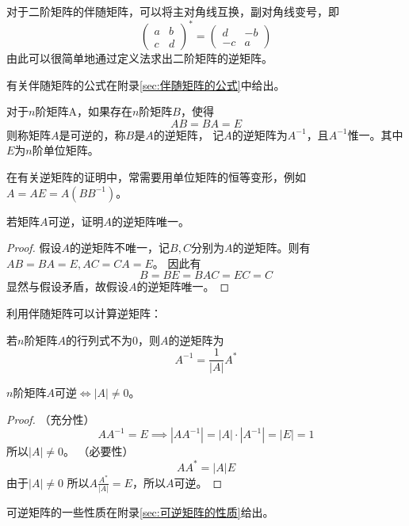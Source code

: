 对于二阶矩阵的伴随矩阵，可以将主对角线互换，副对角线变号，即
\begin{equation}
    \begin{pmatrix}
        a & b \\
        c & d
    \end{pmatrix}^*
    =
    \begin{pmatrix}
        d  & -b \\
        -c & a
    \end{pmatrix}
\end{equation}
由此可以很简单地通过定义法求出二阶矩阵的逆矩阵。

有关伴随矩阵的公式在附录\ref{sec:伴随矩阵的公式}中给出。

\begin{definition}
    对于$n$阶矩阵A，如果存在$n$阶矩阵$B$，使得
    \[ AB = BA = E \]
    则称矩阵$A$是可逆的，称$B$是$A$的逆矩阵，
    记$A$的逆矩阵为$A^{-1}$，且$A^{-1}$惟一。其中$E$为$n$阶单位矩阵。
\end{definition}
在有关逆矩阵的证明中，常需要用单位矩阵的恒等变形，例如$A=AE=A(BB^{-1})$。
\begin{example}
    若矩阵$A$可逆，证明$A$的逆矩阵唯一。
\end{example}
\begin{proof}
    假设$A$的逆矩阵不唯一，记$B,C$分别为$A$的逆矩阵。则有$AB=BA=E, AC=CA=E$。
    因此有
    \[ B = BE = BAC = EC = C \]
    显然与假设矛盾，故假设$A$的逆矩阵唯一。
\end{proof}

利用伴随矩阵可以计算逆矩阵：
\begin{theorem}
    若$n$阶矩阵$A$的行列式不为$0$，则$A$的逆矩阵为
    \[
        A^{-1} = \frac{1}{|A|}A^*
    \]
\end{theorem}

\begin{theorem}
    $n$阶矩阵$A$可逆$\iff |A|\neq 0$。
\end{theorem}
\begin{proof}
    （充分性）
    \[ AA^{-1} = E \implies |AA^{-1}| = |A|\cdot|A^{-1}| = |E| = 1 \]
    所以$|A|\neq 0$。
    （必要性）
    \[ AA^* = |A|E \]
    由于$|A|\neq 0$
    所以$A \frac{A^*}{|A|} = E$，所以$A$可逆。
\end{proof}

可逆矩阵的一些性质在附录\ref{sec:可逆矩阵的性质}给出。

